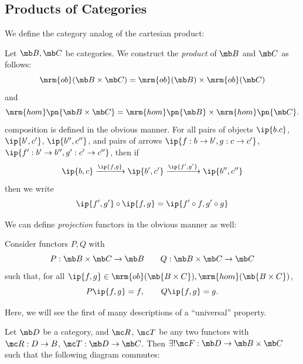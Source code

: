 \documentclass{fkbook}
\newcommand{\ob}{\mrm{ob}}
\newcommand{\homm}{\mrm{hom}}
\begin{document}
\begin{adjustwidth}{1em}{1em}
  \subsection{Products of Categories}
  We define the category analog of the cartesian product:
  \begin{definition}
    Let $\mb B, \mb C$ be categories. We construct the \emph{product}
    of $\mb B$ and $\mb C$ as follows:
    \[
      \ob(\mb B \times \mb C) = \ob(\mb B) \times \ob(\mb C)
    \]
    and
    \[
      \homm\pn{\mb B \times \mb C} = \homm\pn{\mb B} \times
      \homm\pn{\mb C}.
    \]
    composition is defined in the obvious manner. For all pairs of
    objects $\ip{b.c}$, $\ip{b', c'}$, $\ip{b'', c''}$, and pairs of
    arrows $\ip{f : b \to b',g : c \to c'}$, $\ip{f' : b' \to b'', g'
      : c' \to c''}$, then if
    \[
      \ip{b,c} \xrightarrow{\ip{f,g}} \ip{b',c'}
      \xrightarrow{\ip{f',g'}} \ip{b'', c''}
    \]
    then we write
    \[
      \ip{f',g'} \circ \ip{f,g} = \ip{f' \circ f, g' \circ g}
    \]
  \end{definition}
  We can define \emph{projection} functors in the obvious manner as
  well:
  \begin{definition}
    Consider functors $P,Q$ with
    \[
      P : \mb B \times \mb C \to \mb B \qquad Q : \mb B \times \mb C
      \to \mb C
    \]
    such that, for all $\ip{f,g} \in \ob(\mb{B \times C}), \homm(\mb{B
    \times C})$,
    \[
      P\ip{f,g} = f, \qquad Q\ip{f,g} = g.
    \]
  \end{definition}
  Here, we will see the first of many descriptions of a ``universal''
  property.
  \begin{theorem}
    Let $\mb D$ be a category, and $\mc R$, $\mc T$ be any two
    functors with $\mc R : D \to B$, $\mc T : \mb D \to \mb C$. Then
    $\exists! \mc F : \mb D \to \mb B \times \mb C$ such that the
    following diagram commutes:
    \begin{figure}[H]
      \centering
      \tikzset{node distance=2.5cm, auto}
\end{figure}
\end{theorem}
\end{adjustwidth}
\end{document}
